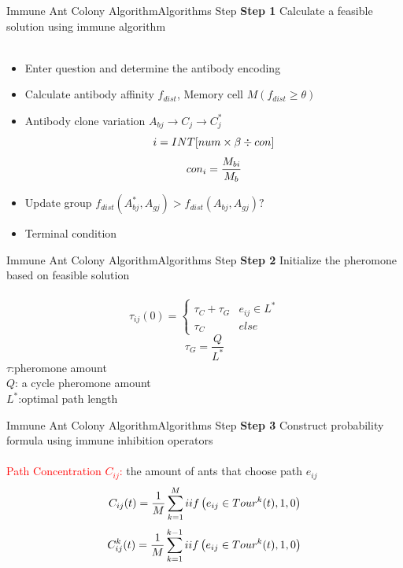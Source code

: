 \begin{frame}{Immune Ant Colony Algorithm}{Algorithms Step}
\large \textbf{Step 1} \normalsize{Calculate a feasible solution using immune algorithm}\\~\\
\begin{itemize}
\item{Enter question and determine the antibody encoding}
\item{Calculate antibody affinity $f_{dist}$, Memory cell $M(f_{dist}\geqslant\theta)$}
\item{Antibody clone variation \qquad $A_{bj}\rightarrow C_j \rightarrow C_j^*$}
\begin{equation}\small{
i=INT[num \times \beta \div con]}
\end{equation}
\begin{equation}\small{
con_i=\frac{M_{bi}}{M_{b}} }
\end{equation}
\item{Update group \qquad \small{$f_{dist}(A_{bj}^*,A_{gj}) > f_{dist}(A_{bj},A_{gj}) ?$}} 
\item{Terminal condition}
\end{itemize}
\end{frame}

\begin{frame}{Immune Ant Colony Algorithm}{Algorithms Step}
\large \textbf{Step 2} \normalsize {Initialize the pheromone based on feasible solution}\\~\\
\begin{equation}
\tau_{ij}(0)=
\begin{cases}
\tau_C +\tau_G & e_{ij} \in L^* \\
\tau_C & else
\end{cases}
\end{equation}
\begin{equation}
\tau_G = \frac{Q}{L^*}
\end{equation}
\centering \small{
{$\tau$:pheromone amount}\\ {$Q$: a cycle pheromone amount}\\ {$L^*$:optimal path length}
}
\end{frame}

\begin{frame}{Immune Ant Colony Algorithm}{Algorithms Step}
\large \textbf{Step 3} \normalsize {Construct probability formula using immune inhibition operators}\\~\\
\centering \small { \textcolor{red}{Path Concentration $C_{ij}$:} the amount of ants that choose path $e_{ij}$}
\begin{equation}\small{
C_{ij}(t) = \frac{1}{M} \sum\limits_{k=1}^{M}iif \left(e_{ij} \in Tour^k(t),1,0\right)}
\end{equation}
\begin{equation}\small{
C_{ij}^k(t) = \frac{1}{M} \sum\limits_{k=1}^{k-1}iif \left(e_{ij} \in Tour^k(t),1,0\right)}
\end{equation}
\end{frame}

